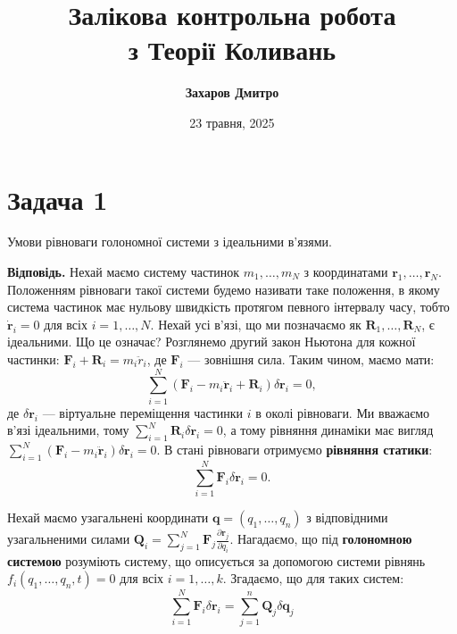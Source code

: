 \documentclass{hw_template}
\title{\bfseries Залікова контрольна робота \\ з Теорії Коливань}
\author{\bfseries Захаров Дмитро}
\date{23 травня, 2025}
\begin{document}
\pagestyle{fancy}

\maketitle

\tableofcontents

\vspace{20px}

\section{Задача 1}

\begin{problem}
    Умови рівноваги голономної системи з ідеальними в'язями.
\end{problem}

\textbf{Відповідь.} Нехай маємо систему частинок $m_1,\dots,m_N$ з координатами
$\mathbf{r}_1,\dots,\mathbf{r}_N$. Положенням рівноваги такої системи будемо
називати таке положення, в якому система частинок має нульову швидкість протягом
певного інтервалу часу, тобто $\dot{\mathbf{r}}_i=0$ для всіх $i=1,\dots,N$.
Нехай усі в'язі, що ми позначаємо як $\mathbf{R}_1,\dots,\mathbf{R}_N$, є
ідеальними. Що це означає? Розглянемо другий закон Ньютона для кожної частинки:
$\mathbf{F}_i+\mathbf{R}_i=m_i\ddot{r}_i$, де $\mathbf{F}_i$ --- зовнішня сила. 
Таким чином, маємо мати:
\begin{equation*}
    \sum_{i=1}^N (\mathbf{F}_i - m_i\ddot{\mathbf{r}}_i + \mathbf{R}_i) \delta \mathbf{r}_i = 0,
\end{equation*}
де $\delta \mathbf{r}_i$ --- віртуальне переміщення частинки $i$ в околі
рівноваги. Ми вважаємо в'язі ідеальними, тому $\sum_{i=1}^N \mathbf{R}_i \delta
\mathbf{r}_i = 0$, а тому рівняння динаміки має вигляд $\sum_{i=1}^N
(\mathbf{F}_i - m_i\ddot{\mathbf{r}}_i)\delta \mathbf{r}_i = 0$. В стані
рівноваги отримуємо \textbf{рівняння статики}:
\begin{equation*}
    \sum_{i=1}^N \mathbf{F}_i \delta \mathbf{r}_i = 0.
\end{equation*}

Нехай маємо узагальнені координати $\mathbf{q}=(q_1,\dots,q_n)$ з відповідними
узагальненими силами $\mathbf{Q}_i=\sum_{j=1}^N \mathbf{F}_j \frac{\partial
\mathbf{r}_j}{\partial q_i}$. Нагадаємо, що під \textbf{голономною системою}
розуміють систему, що описується за допомогою системи рівнянь
$f_i(q_1,\dots,q_n,t)=0$ для всіх $i=1,\dots,k$. Згадаємо, що для 
таких систем:
\begin{equation*}
    \sum_{i=1}^N \mathbf{F}_i \delta \mathbf{r}_i = \sum_{j=1}^n \mathbf{Q}_j\delta \mathbf{q}_j
\end{equation*}
\end{document}
